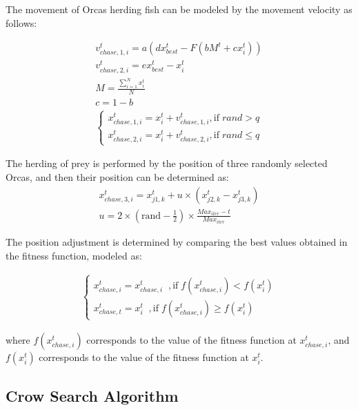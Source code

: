 \documentclass{elsarticle}
\begin{document}
\noindent The movement of Orcas herding fish can be modeled by the movement velocity as follows:

\begin{equation}
\begin{gathered}
v_{chase,1,i}^t = a ( d x_{best}^t - F (b M^t + c x_i^t)) \\
v_{chase,2,i}^t = e x_{best}^t - x_{i}^t \\
M = \frac{\sum_{i=1}^{N} x_i^t}{N} \\
c=1-b \\
\begin{cases}
  x_{chase,1,i}^t = x_{i}^t + v_{chase,1,i}^t , \text{if} \;rand > q \\
  x_{chase,2,i}^t = x_{i}^t + v_{chase,2,i}^t  , \text{if} \;rand \leq q
\end{cases}
\end{gathered}
\label{eq19}
\end{equation}

\noindent The herding of prey is performed by the position of three randomly selected Orcas, and then their position can be determined as:
\begin{equation}
\begin{gathered}
x_{chase,3,i}^t =x_{j1,k}^t +u \times (x_{j2,k}^t - x_{j3,k}^t ) \\
u = 2 \times (\text{rand} - \frac{1}{2}) \times \frac{Max_{iter}-t}{Max_{iter}}
\end{gathered}
\label{eq20}
\end{equation}

\noindent The position adjustment is determined by comparing the best values obtained in the fitness function, modeled as:

\begin{equation}
\begin{gathered}
\begin{cases}
  x_{chase,i}^t = x_{chase,i}^t \;\;, \text{if} \; f(x_{chase,i}^t) < f(x_{i}^t ) \\
  x_{chase,t}^t = x_{i}^t  \;\;, \text{if} \;f(x_{chase,i}^t) \geq f(x_{i}^t )
\end{cases}
\end{gathered}
\label{eq21}
\end{equation}

where $f(x_{chase,i}^t)$ corresponds to the value of the fitness function at $x_{chase,i}^t$, and $f(x_{i}^t )$ corresponds to the value of the fitness function at $x_{i}^t$.

\subsection{Crow Search Algorithm}
\end{document}
